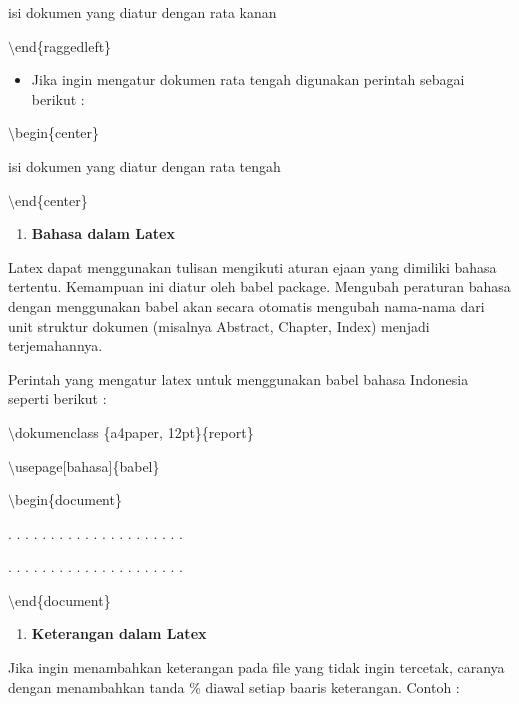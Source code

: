 \hspace{0,5in}isi dokumen yang diatur dengan rata kanan

\hspace{0,5in}$\setminus$end\{raggedleft\}

\begin{itemize}
\item Jika ingin mengatur dokumen rata tengah digunakan perintah sebagai berikut :
\end{itemize}
\hspace{0,5in}$\setminus$begin\{center\}

\hspace{0,5in}isi dokumen yang diatur dengan rata tengah

\hspace{0,5in}$\setminus$end\{center\}

\begin{enumerate}
\setcounter{enumi}{\thenumberedCntB}
\item \textbf{Bahasa dalam Latex}
\setcounter{numberedCntB}{\theenumi}
\end{enumerate}
\hspace{0,5in}Latex dapat menggunakan tulisan mengikuti aturan ejaan yang dimiliki bahasa tertentu. Kemampuan ini diatur oleh babel package. Mengubah peraturan bahasa dengan menggunakan babel akan secara otomatis mengubah nama-nama dari unit struktur dokumen (misalnya Abstract, Chapter, Index) 
menjadi terjemahannya.\par \vspace{12pt}

Perintah yang mengatur latex untuk menggunakan babel bahasa Indonesia seperti berikut :

$\setminus$dokumenclass \{a4paper, 12pt\}\{report\}\par \vspace{12pt}

$\setminus$usepage$[$bahasa$]$\{babel\}\par \vspace{12pt}

$\setminus$begin\{document\}\par \vspace{12pt}

. . . . . . . . . . . . . . . . . . . . .

. . . . . . . . . . . . . . . . . . . . .
\par \vspace{12pt}
$\setminus$end\{document\}

\begin{enumerate}
\setcounter{enumi}{\thenumberedCntB}
\item \textbf{Keterangan dalam Latex}
\setcounter{numberedCntB}{\theenumi}
\end{enumerate}
\hspace{0,5in}Jika ingin menambahkan keterangan pada file yang tidak ingin tercetak, caranya dengan menambahkan tanda \% diawal setiap baaris keterangan. Contoh :\par \vspace{12pt}

